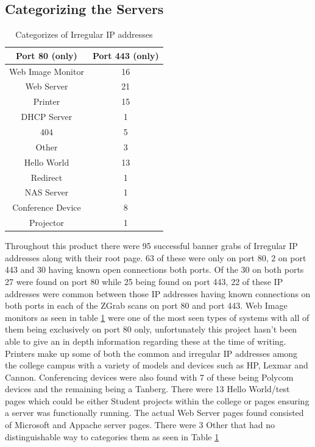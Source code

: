 \documentclass[a4wide,leqno,12pt]{report}
\begin{document}
\subsection{Categorizing the Servers}
\begin{table}[H]
\centering
\begin{tabular}{||c c  ||}
 \hline
 Port 80 (only) & Port 443 (only)\\ [0.5ex]
 \hline\hline
Web Image Monitor& 16\\
Web Server & 21\\
Printer&15\\
DHCP Server&1\\
404&5\\
Other& 3\\
Hello World&13\\
Redirect&1\\
NAS Server&1\\
Conference Device&8\\
Projector&1\\[1ex]

 \hline
\end{tabular}
\caption{Categorizes of Irregular IP addresses}
\label{table:category}
\end{table}

Throughout this product there were 95 successful banner grabs of Irregular IP addresses along with their root page. 63 of these were only on port 80, 2 on port 443 and 30 having known open connections both ports. Of the 30 on both ports 27 were found on port 80 while 25 being found on port 443, 22 of these IP addresses were common between those IP addresses having known connections on both ports in each of the ZGrab scans on port 80 and port 443. Web Image monitors as seen in table \ref{table:category} were one of the most seen types of systems with all of them being exclusively on port 80 only, unfortunately this project hasn't been able to give an in depth information regarding these at the time of writing. Printers make up some of both the common and irregular IP addresses among the college campus with a variety of  models and devices such as HP, Lexmar and Cannon. Conferencing devices were also found with 7 of these being Polycom devices and the remaining being a Tanberg. There were 13 Hello World/test pages which could be either Student projects within the college or pages ensuring a server was functionally running. The actual Web Server pages  found consisted of Microsoft and Appache server pages. There were 3 Other that had no distinguishable way to categories them as seen in Table \ref{table:category} 
\end{document}
